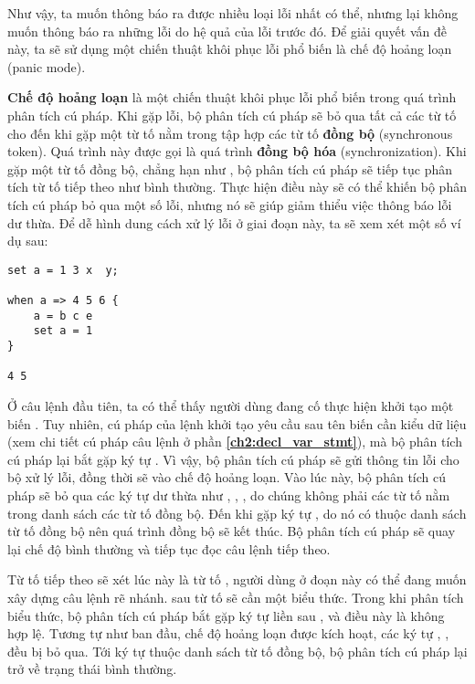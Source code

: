     Như vậy, ta muốn thông báo ra được nhiều loại lỗi nhất có thể, nhưng lại không muốn thông báo ra những lỗi do hệ quả của lỗi trước đó. Để giải quyết vấn đề này, ta sẽ sử dụng một chiến thuật khôi phục lỗi phổ biến là chế độ hoảng loạn (panic mode). 

    \textbf{Chế độ hoảng loạn} là một chiến thuật khôi phục lỗi phổ biến trong quá trình phân tích cú pháp. Khi gặp lỗi, bộ phân tích cú pháp sẽ bỏ qua tất cả các từ tố cho đến khi gặp một từ tố nằm trong tập hợp các từ tố \textbf{đồng bộ} (synchronous token). Quá trình này được gọi là quá trình \textbf{đồng bộ hóa} (synchronization). Khi gặp một từ tố đồng bộ, chẳng hạn như \kw{;}, bộ phân tích cú pháp sẽ tiếp tục phân tích từ tố tiếp theo như bình thường. Thực hiện điều này sẽ có thể khiến bộ phân tích cú pháp bỏ qua một số lỗi, nhưng nó sẽ giúp giảm thiểu việc thông báo lỗi dư thừa. Để dễ hình dung cách xử lý lỗi ở giai đoạn này, ta sẽ xem xét một số ví dụ sau:

\begin{lstlisting}[]
set a = 1 3 x  y;

when a => 4 5 6 {
    a = b c e
    set a = 1
}

4 5
\end{lstlisting}

Ở câu lệnh đầu tiên, ta có thể thấy người dùng đang cố thực hiện khởi tạo một biến . Tuy nhiên, cú pháp của lệnh khởi tạo yêu cầu sau tên biến cần kiểu dữ liệu (xem chi tiết cú pháp câu lệnh ở phần \textbf{\ref{ch2:decl_var_stmt}}), mà bộ phân tích cú pháp lại bắt gặp ký tự \kw{=}. Vì vậy, bộ phân tích cú pháp sẽ gửi thông tin lỗi cho bộ xử lý lỗi, đồng thời sẽ vào chế độ hoảng loạn. Vào lúc này, bộ phân tích cú pháp sẽ bỏ qua các ký tự dư thừa như , , ,  do chúng không phải các từ tố nằm trong danh sách các từ tố đồng bộ. Đến khi gặp ký tự \kw{;}, do nó có thuộc danh sách từ tố đồng bộ nên quá trình đồng bộ sẽ kết thúc. Bộ phân tích cú pháp sẽ quay lại chế độ bình thường và tiếp tục đọc câu lệnh tiếp theo. 

Từ tố tiếp theo sẽ xét lúc này là từ tố , người dùng ở đoạn này có thể đang muốn xây dựng câu lệnh rẽ nhánh. sau từ tố  sẽ cần một biểu thức. Trong khi phân tích biểu thức, bộ phân tích cú pháp bắt gặp ký tự \kw{>} liền sau \kw{=}, và điều này là không hợp lệ. Tương tự như ban đầu, chế độ hoảng loạn được kích hoạt, các ký tự , ,  đều bị bỏ qua. Tới ký tự \kw{\{} thuộc danh sách từ tố đồng bộ, bộ phân tích cú pháp lại trở về trạng thái bình thường.

